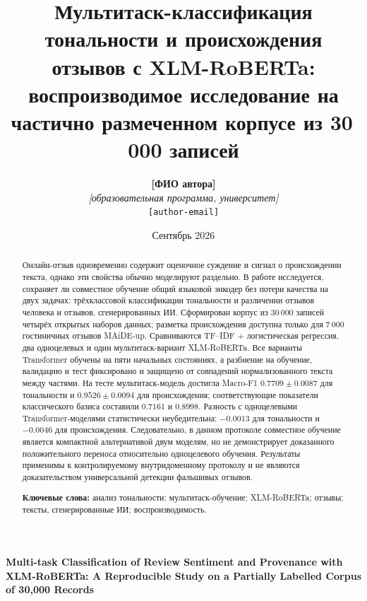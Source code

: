 \documentclass[11pt,a4paper]{article}
\title{Мультитаск-классификация тональности и происхождения отзывов с XLM-RoBERTa:\\
воспроизводимое исследование на частично размеченном корпусе из 30\,000 записей}
\author{\textbf{[ФИО автора]}\\
\textit{[образовательная программа, университет]}\\
\texttt{[author-email]}}
\date{Сентябрь 2026}
\begin{document}
\maketitle

\begin{abstract}
Онлайн-отзыв одновременно содержит оценочное суждение и сигнал о происхождении текста, однако эти свойства обычно моделируют раздельно. В работе исследуется, сохраняет ли совместное обучение общий языковой энкодер без потери качества на двух задачах: трёхклассовой классификации тональности и различении отзывов человека и отзывов, сгенерированных ИИ. Сформирован корпус из 30\,000 записей четырёх открытых наборов данных; разметка происхождения доступна только для 7\,000 гостиничных отзывов MAiDE-up. Сравниваются TF--IDF + логистическая регрессия, два одноцелевых и один мультитаск-вариант XLM-RoBERTa. Все варианты Transformer обучены на пяти начальных состояниях, а разбиение на обучение, валидацию и тест фиксировано и защищено от совпадений нормализованного текста между частями. На тесте мультитаск-модель достигла Macro-F1 $0.7709\pm0.0087$ для тональности и $0.9526\pm0.0094$ для происхождения; соответствующие показатели классического базиса составили $0.7161$ и $0.8998$. Разность с одноцелевыми Transformer-моделями статистически неубедительна: $-0.0013$ для тональности и $-0.0046$ для происхождения. Следовательно, в данном протоколе совместное обучение является компактной альтернативой двум моделям, но не демонстрирует доказанного положительного переноса относительно одноцелевого обучения. Результаты применимы к контролируемому внутридоменному протоколу и не являются доказательством универсальной детекции фальшивых отзывов.

\medskip
\noindent\textbf{Ключевые слова:} анализ тональности; мультитаск-обучение; XLM-RoBERTa; отзывы; тексты, сгенерированные ИИ; воспроизводимость.
\end{abstract}

\begin{center}
\textbf{Multi-task Classification of Review Sentiment and Provenance with XLM-RoBERTa: A Reproducible Study on a Partially Labelled Corpus of 30,000 Records}
\end{center}
\par\medskip
\end{document}
